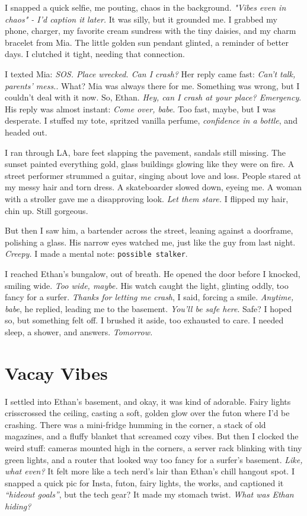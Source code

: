 \documentclass[12pt,oneside]{book} %
\newcommand{\note}[1]{\texttt{#1}}
\begin{document}
I snapped a quick selfie, me pouting, chaos in the background. \textit{"Vibes even in chaos" - I’d caption it later.} It was silly, but it grounded me. I grabbed my phone, charger, my favorite cream sundress with the tiny daisies, and my charm bracelet from Mia. The little golden sun pendant glinted, a reminder of better days. I clutched it tight, needing that connection.

I texted Mia: \textit{SOS. Place wrecked. Can I crash?} Her reply came fast: \textit{Can’t talk, parents’ mess.}. What? Mia was always there for me. Something was wrong, but I couldn’t deal with it now. So, Ethan. \textit{Hey, can I crash at your place? Emergency}. His reply was almost instant: \textit{Come over, babe}. Too fast, maybe, but I was desperate. I stuffed my tote, spritzed vanilla perfume, \textit{confidence in a bottle}, and headed out.

I ran through LA, bare feet slapping the pavement, sandals still missing. The sunset painted everything gold, glass buildings glowing like they were on fire. A street performer strummed a guitar, singing about love and loss. People stared at my messy hair and torn dress. A skateboarder slowed down, eyeing me. A woman with a stroller gave me a disapproving look. \textit{Let them stare.} I flipped my hair, chin up. Still gorgeous.

But then I saw him, a bartender across the street, leaning against a doorframe, polishing a glass. His narrow eyes watched me, just like the guy from last night. \textit{Creepy.} I made a mental note: \note{possible stalker}.

I reached Ethan’s bungalow, out of breath. He opened the door before I knocked, smiling wide. \textit{Too wide, maybe.} His watch caught the light, glinting oddly, too fancy for a surfer. \textit{Thanks for letting me crash}, I said, forcing a smile. \textit{Anytime, babe}, he replied, leading me to the basement. \textit{You’ll be safe here}. Safe? I hoped so, but something felt off. I brushed it aside, too exhausted to care. I needed sleep, a shower, and answers. \textit{Tomorrow.}

\chapter{Vacay Vibes}

I settled into Ethan’s basement, and okay, it was kind of adorable. Fairy lights crisscrossed the ceiling, casting a soft, golden glow over the futon where I’d be crashing. There was a mini-fridge humming in the corner, a stack of old magazines, and a fluffy blanket that screamed cozy vibes. But then I clocked the weird stuff: cameras mounted high in the corners, a server rack blinking with tiny green lights, and a router that looked way too fancy for a surfer’s basement. \textit{Like, what even?} It felt more like a tech nerd’s lair than Ethan’s chill hangout spot. I snapped a quick pic for Insta, futon, fairy lights, the works, and captioned it \textit{“hideout goals”}, but the tech gear? It made my stomach twist. \textit{What was Ethan hiding?}
\end{document}
